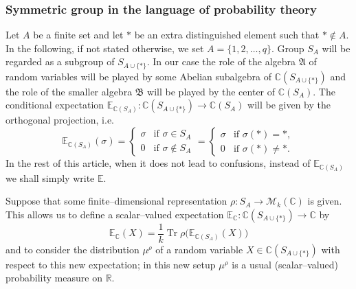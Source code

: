 \documentclass[12pt,dvips]{amsart}
\numberwithin{equation}{section} \numberwithin{figure}{section}
\theoremstyle{plain}
\theoremstyle{definition}
\theoremstyle{remark}
\newcommand{\A}{{\mathfrak{A}}}
\newcommand{\B}{{\mathfrak{B}}}
\newcommand{\E}{{\mathbb{E}}}
\newcommand{\C}{{\mathbb{C}}}
\newcommand{\R}{{\mathbb{R}}}
\newcommand{\M}{{\mathcal{M}}}
\newcommand{\Sn}[1]{{{S}}_{#1}}
\newcommand{\xtra}{\ast}
\DeclareMathOperator{\Tr}{Tr}
\begin{document}
\subsubsection{Symmetric group in the language of probability theory}
\label{subsec:symmetricgroupprobability} Let $A$ be a finite set and
let $\xtra$ be an extra distinguished element such that $\xtra\notin
A$. In the following, if not stated otherwise, we set
$A=\{1,2,\dots,q\}$.  Group $\Sn{A}$ will be regarded as a subgroup
of $\Sn{A\cup \{\xtra\}}$. In our case the role of the algebra $\A$
of random variables will be played by some Abelian subalgebra of
$\C(\Sn{A\cup\{\xtra\} })$ and the role of the smaller algebra $\B$
will be played by the center of $\C(\Sn{A})$. The conditional
expectation $\E_{\C(\Sn{A})} :\C(\Sn{A\cup\{\xtra\}})\rightarrow
\C(\Sn{A}) $ will be given by the orthogonal projection, i.e.
$$ \E_{\C(\Sn{A})}(\sigma)=\begin{cases} \sigma & \text{if } \sigma\in\Sn{A} \\
0 & \text{if } \sigma\notin\Sn{A} \end{cases}=
\begin{cases} \sigma & \text{if } \sigma(\xtra)=\xtra, \\
0 & \text{if } \sigma(\xtra)\neq \xtra .\end{cases}
$$
In the rest of this article, when it does not lead to confusions,
instead of $\E_{\C(\Sn{A})}$ we shall simply write
\index{$E$@$\E:\C(\Sn{A\cup\{\xtra\}})\rightarrow \C(\Sn{A}) $}
$\E$.

Suppose that some finite--dimensional representation
$\rho:\Sn{A}\rightarrow \M_k(\C)$ is given. This allows us to define
a scalar--valued expectation
$\E_\C:\C(\Sn{A\cup\{\xtra\}})\rightarrow\C$ by
\begin{equation}
\label{eq:wartoscoczekiwanahihihi} \E_\C(X)=\frac{1}{k} \Tr
\rho\big(\E_{\C(\Sn{A})}(X)\big)
\end{equation}
 and
to consider the distribution $\mu^{\rho}$ of a random variable
$X\in\C(\Sn{A\cup\{\xtra\}})$ with respect to this new expectation;
in this new setup $\mu^{\rho}$ is a usual (scalar--valued)
probability measure on $\R$.

%
\end{document}
